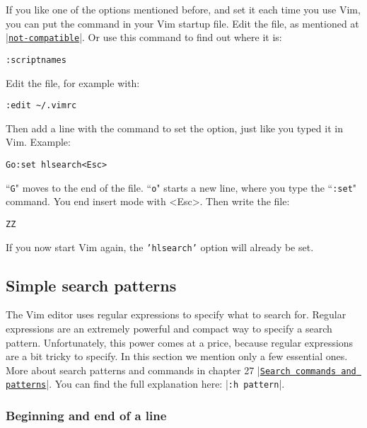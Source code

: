 If you like one of the options mentioned before, and set it each time you use Vim, you can put the command in your Vim startup file.
Edit the file, as mentioned at \hyperref[not-compatible]{|\texttt{not-compatible}|}.
Or use this command to find out where it is:

 \begin{Verbatim}[samepage=true]
 :scriptnames
 \end{Verbatim}

Edit the file, for example with:

 \begin{Verbatim}[samepage=true]
 :edit ~/.vimrc
 \end{Verbatim}

Then add a line with the command to set the option, just like you typed it in Vim.
Example:

 \begin{Verbatim}[samepage=true]
 Go:set hlsearch<Esc>
 \end{Verbatim}

``\texttt{G}" moves to the end of the file.
``\texttt{o}" starts a new line, where you type the ``\texttt{:set}" command.
You end insert mode with <Esc>.
Then write the file:

 \begin{Verbatim}[samepage=true]
 ZZ
 \end{Verbatim}

If you now start Vim again, the \texttt{'hlsearch'} option will already be set.

\subsection{Simple search patterns}
\label{Simple search patterns}

The Vim editor uses regular expressions to specify what to search for.
Regular expressions are an extremely powerful and compact way to specify a search pattern.
Unfortunately, this power comes at a price, because regular expressions are a bit tricky to specify.
In this section we mention only a few essential ones.
More about search patterns and commands in chapter 27 |\hyperref[Search commands and patterns]{\texttt{Search commands and patterns}}|.
You can find the full explanation here: |\texttt{:h pattern}|.

\subsubsection{Beginning and end of a line}

